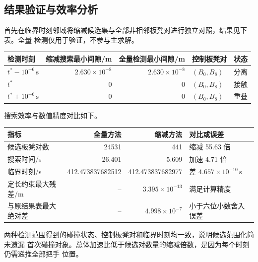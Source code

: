 \documentclass[
  11pt,
  UTF8]{ctexart}
\begin{document}
\subsection{结果验证与效率分析}

首先在临界时刻邻域将缩减候选集与全部非相邻板凳对进行独立对照，结果见下表。全量
检测仅用于验证，不参与主求解。

\begin{longtable}[]{@{}lrrlc@{}}
\toprule
检测时刻 & 缩减搜索最小间隙/m & 全量检测最小间隙/m & 控制板凳对 & 状态 \\
\midrule
\endhead
\(t^*-10^{-6}\,\mathrm s\) & \(2.630\times10^{-8}\) &
\(2.630\times10^{-8}\) & \((B_0,B_8)\) & 分离 \\
\(t^*\) & 0 & 0 & \((B_0,B_8)\) & 接触 \\
\(t^*+10^{-6}\,\mathrm s\) & 0 & 0 & \((B_0,B_8)\) & 重叠 \\
\bottomrule
\end{longtable}

搜索效率与数值精度对比如下。

\begin{longtable}[]{@{}lrrl@{}}
\toprule
指标 & 全量方法 & 缩减方法 & 对比或误差 \\
\midrule
\endhead
候选板凳对数 & 24531 & 441 & 缩减 55.63 倍 \\
搜索时间/s & 26.401 & 5.609 & 加速 4.71 倍 \\
临界时刻/s & 412.473837682512 & 412.473837682977 &
差 \(4.657\times10^{-10}\,\mathrm s\) \\
定长约束最大残差/m & -- & \(3.395\times10^{-13}\) & 满足计算精度 \\
与原结果表最大绝对差 & -- & \(4.998\times10^{-7}\) & 小于六位小数舍入误差 \\
\bottomrule
\end{longtable}

两种检测范围得到的碰撞状态、控制板凳对和临界时刻均一致，说明候选范围化简未遗漏
首次碰撞对象。总体加速比低于候选对数量的缩减倍数，是因为每个时刻仍需递推全部把手
位置。
\end{document}

